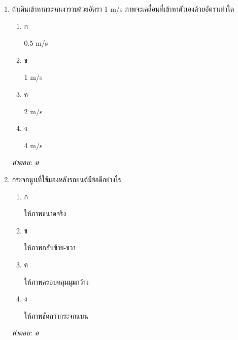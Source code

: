 \documentclass[12pt]{article}
\begin{document}
\begin{enumerate}[label=\arabic*., itemsep=0.5\baselineskip, topsep=0.5\baselineskip, leftmargin=*]
\item ถ้าเดินเข้าหากระจกเงาราบด้วยอัตรา 1 m/s ภาพจะเคลื่อนที่เข้าหาตัวเองด้วยอัตราเท่าใด
\begin{enumerate}[label=\alph*)., itemsep=0.3\baselineskip, topsep=0.3\baselineskip]
\item ก\ 
\begin{minipage}[t]{0.9\linewidth}
\raggedright 0.5 m/s
\end{minipage}
\item ข\ 
\begin{minipage}[t]{0.9\linewidth}
\raggedright 1 m/s
\end{minipage}
\item ค\ 
\begin{minipage}[t]{0.9\linewidth}
\raggedright 2 m/s
\end{minipage}
\item ง\ 
\begin{minipage}[t]{0.9\linewidth}
\raggedright 4 m/s
\end{minipage}
\end{enumerate}
\vspace{-0.3\baselineskip}
\begin{small}
\textit{คำตอบ: ค}
\end{small}

\item กระจกนูนที่ใช้มองหลังรถยนต์มีข้อดีอย่างไร
\begin{enumerate}[label=\alph*)., itemsep=0.3\baselineskip, topsep=0.3\baselineskip]
\item ก\ 
\begin{minipage}[t]{0.9\linewidth}
\raggedright ให้ภาพขนาดจริง
\end{minipage}
\item ข\ 
\begin{minipage}[t]{0.9\linewidth}
\raggedright ให้ภาพกลับซ้าย-ขวา
\end{minipage}
\item ค\ 
\begin{minipage}[t]{0.9\linewidth}
\raggedright ให้ภาพครอบคลุมมุมกว้าง
\end{minipage}
\item ง\ 
\begin{minipage}[t]{0.9\linewidth}
\raggedright ให้ภาพชัดกว่ากระจกแบน
\end{minipage}
\end{enumerate}
\vspace{-0.3\baselineskip}
\begin{small}
\textit{คำตอบ: ค}
\end{small}


\end{enumerate}
\end{document}
